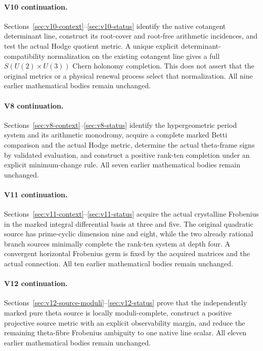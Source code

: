 \documentclass[11pt]{article}
\theoremstyle{definition}
\theoremstyle{remark}
\begin{document}
\paragraph{V10 continuation.}
Sections~\ref{sec:v10-context}--\ref{sec:v10-status} identify the native
cotangent determinant line, construct its root-cover and root-free
arithmetic incidences, and test the actual Hodge quotient metric. A unique
explicit determinant-compatibility normalization on the existing cotangent
line gives a full $S(U(2)\times U(3))$ Chern holonomy completion. This does
not assert that the original metrics or a physical renewal process select
that normalization. All nine earlier mathematical bodies remain unchanged.

\tableofcontents
\clearpage

\paragraph{V8 continuation.}
Sections~\ref{sec:v8-context}--\ref{sec:v8-status} identify the hypergeometric
period system and its arithmetic monodromy, acquire a complete marked Betti
comparison and the actual Hodge metric, determine the actual theta-frame
signs by validated evaluation, and construct a positive rank-ten completion
under an explicit minimum-change rule. All seven earlier mathematical
bodies remain unchanged.

\paragraph{V11 continuation.}
Sections~\ref{sec:v11-context}--\ref{sec:v11-status} acquire the actual
crystalline Frobenius in the marked integral differential basis at three
and five. The original quadratic source has prime-cyclic dimension nine
and eight, while the two already rational branch sources minimally
complete the rank-ten system at depth four. A convergent horizontal
Frobenius germ is fixed by the acquired matrices and the actual connection.
All ten earlier mathematical bodies remain unchanged.
\paragraph{V12 continuation.}
Sections~\ref{sec:v12-source-moduli}--\ref{sec:v12-status} prove that the
independently marked pure theta source is locally moduli-complete, construct
a positive projective source metric with an explicit observability margin,
and reduce the remaining theta-fibre Frobenius ambiguity to one native line
scalar. All eleven earlier mathematical bodies remain unchanged.
\end{document}
